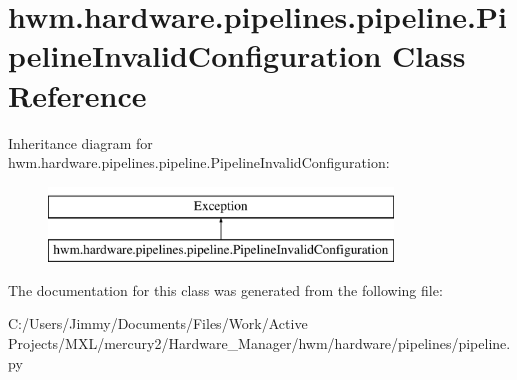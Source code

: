 \hypertarget{classhwm_1_1hardware_1_1pipelines_1_1pipeline_1_1_pipeline_invalid_configuration}{\section{hwm.\-hardware.\-pipelines.\-pipeline.\-Pipeline\-Invalid\-Configuration Class Reference}
\label{classhwm_1_1hardware_1_1pipelines_1_1pipeline_1_1_pipeline_invalid_configuration}
}
Inheritance diagram for hwm.\-hardware.\-pipelines.\-pipeline.\-Pipeline\-Invalid\-Configuration\-:\begin{figure}[H]
\begin{center}
\leavevmode
\includegraphics[height=2.000000cm]{classhwm_1_1hardware_1_1pipelines_1_1pipeline_1_1_pipeline_invalid_configuration}
\end{center}
\end{figure}


The documentation for this class was generated from the following file\-:\begin{DoxyCompactItemize}
\item 
C\-:/\-Users/\-Jimmy/\-Documents/\-Files/\-Work/\-Active Projects/\-M\-X\-L/mercury2/\-Hardware\-\_\-\-Manager/hwm/hardware/pipelines/pipeline.\-py\end{DoxyCompactItemize}
